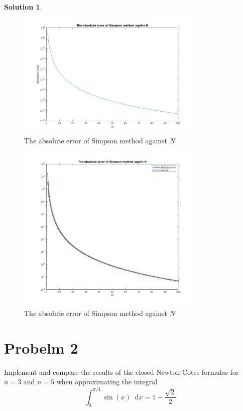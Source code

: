 \documentclass{article}
\newcommand*\diff{\mathop{}\!\mathrm{d}}
\theoremstyle{definition}
\newtheorem{solution}{Solution}
\begin{document}
\begin{solution}
\begin{enumerate}
	\end{enumerate}
	\begin{figure}[ht]
      \label{Fig:solution_to_problem1}
      \includegraphics[width=0.8\textwidth]{solution_to_problem1.jpg}
      \centering
      \caption{The absolute error of Simpson method against $N$}
    \end{figure}
    \begin{figure}[ht]
      \label{Fig:bounds}
      \includegraphics[width=0.8\textwidth]{bounds.jpg}
      \centering
      \caption{The absolute error of Simpson method against $N$}
    \end{figure}
\end{solution}

\section{Probelm 2}
Implement and compare the results of the closed Newton-Cotes formulas for $n = 3$ and $n = 5$ when approximating the integral
\begin{equation}
	\int_{0}^{\pi/4}\sin(x)\diff x=1-\frac{\sqrt{2}}{2}
\end{equation}
\end{document}
